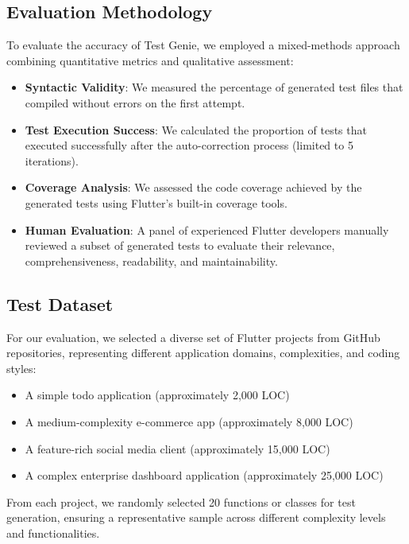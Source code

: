 \subsection{Evaluation Methodology}

To evaluate the accuracy of Test Genie, we employed a mixed-methods approach combining quantitative metrics and qualitative assessment:

\begin{itemize}
    \item \textbf{Syntactic Validity}: We measured the percentage of generated test files that compiled without errors on the first attempt.
    
    \item \textbf{Test Execution Success}: We calculated the proportion of tests that executed successfully after the auto-correction process (limited to 5 iterations).
    
    \item \textbf{Coverage Analysis}: We assessed the code coverage achieved by the generated tests using Flutter's built-in coverage tools.

    \item \textbf{Human Evaluation}: A panel of experienced Flutter developers manually reviewed a subset of generated tests to evaluate their relevance, comprehensiveness, readability, and maintainability.

\end{itemize}

\subsection{Test Dataset}

For our evaluation, we selected a diverse set of Flutter projects from GitHub repositories, representing different application domains, complexities, and coding styles:

\begin{itemize}
    \item A simple todo application (approximately 2,000 LOC)
    \item A medium-complexity e-commerce app (approximately 8,000 LOC)
    \item A feature-rich social media client (approximately 15,000 LOC)
    \item A complex enterprise dashboard application (approximately 25,000 LOC)
\end{itemize}

From each project, we randomly selected 20 functions or classes for test generation, ensuring a representative sample across different complexity levels and functionalities.

